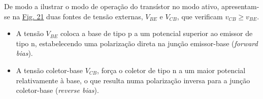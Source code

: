 \noindent De modo a ilustrar o modo de operação do transístor no modo ativo, apresentam-se na \hyperref[fig:active-mode]{Fig. 21} duas fontes de tensão externas, $V_\textit{BE}$ e $V_\textit{CB}$, que verificam $v_\textit{CB} \ge v_\textit{BE}$.

\begin{itemize}[leftmargin=*]
    \item A tensão $V_\textit{BE}$ coloca a base de tipo p a um potencial superior ao emissor de tipo n, estabelecendo uma polarização direta na junção emissor-base (\textit{forward bias}). 
    
    \item A tensão coletor-base $V_\textit{CB}$, força o coletor de tipo n a um maior potencial relativamente à base, o que resulta numa polarização inversa para a junção coletor-base (\textit{reverse bias}).
\end{itemize}

